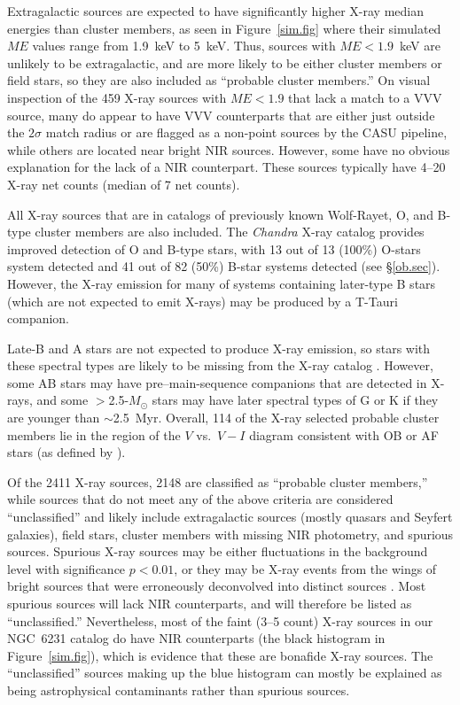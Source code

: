 \documentclass[twocolumn,tighten]{aastex61}
\begin{document}
Extragalactic sources are expected to have significantly higher X-ray median energies than cluster members, as seen in Figure~\ref{sim.fig} where their simulated $ME$ values range from 1.9~keV to 5~keV. Thus, sources with $ME<1.9$~keV are unlikely to be extragalactic, and are more likely to be either cluster members or field stars, so they are also included as ``probable cluster members.''  On visual inspection of the 459 X-ray sources with $ME<1.9$ that lack a match to a VVV source, many do appear to have VVV counterparts that are either just outside the $2\sigma$ match radius or are flagged as a non-point sources by the CASU pipeline, while others are located near bright NIR sources. However, some have no obvious explanation for the lack of a NIR counterpart. These sources typically have 4--20 X-ray net counts (median of 7 net counts).

All X-ray sources that are in catalogs of previously known Wolf-Rayet, O, and B-type cluster members \citep[compiled by][]{2006MNRAS.372..661S} are also included. The {\it Chandra} X-ray catalog provides improved detection of O and B-type stars, with 13 out of 13  (100\%) O-stars system detected and 41 out of 82 (50\%) B-star systems detected (see \S\ref{ob.sec}). However, the X-ray emission for many of systems containing later-type B stars (which are not expected to emit X-rays) may be produced by a T-Tauri companion. 

Late-B and A stars are not expected to produce X-ray emission, so stars with these spectral types are likely to be missing from the X-ray catalog \citep{2007MNRAS.381.1569H}. However, some AB stars may have pre--main-sequence companions that are detected in X-rays, and some $>$2.5-$M_\odot$ stars may have later spectral types of G or K if they are younger than $\sim$2.5~Myr. Overall, 114 of the X-ray selected probable cluster members lie in the region of the $V$ vs.\ $V-I$ diagram consistent with OB or AF stars (as defined by ).


Of the 2411 X-ray sources, 2148 are classified as ``probable cluster members,'' while sources that do not meet any of the above criteria are considered ``unclassified'' and likely include extragalactic sources (mostly quasars and Seyfert galaxies), field stars, cluster members with missing NIR photometry, and spurious sources. Spurious X-ray sources may be either fluctuations in the background level with significance $p<0.01$, or they may be X-ray events from the wings of bright sources that were erroneously deconvolved into distinct sources \citep[cf.][]{2013ApJS..209...27K}. Most spurious sources will lack NIR counterparts, and will therefore be listed as ``unclassified.'' Nevertheless, most of the faint (3--5 count) X-ray sources in our NGC~6231 catalog do have NIR counterparts (the black histogram in Figure~\ref{sim.fig}), which is evidence that these are bonafide X-ray sources. The ``unclassified'' sources making up the blue histogram can mostly be explained as being astrophysical contaminants rather than spurious sources.
\end{document}
